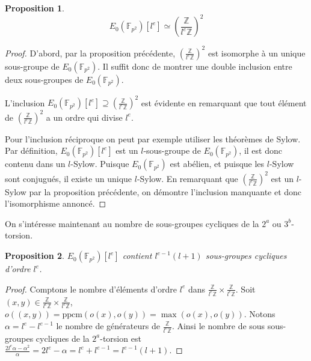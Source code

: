 \documentclass{article}
\newtheorem{prop}{Proposition}
\newcommand{\Fq}{\mathbb{F}_{p^2}}
\newcommand{\Z}{\mathbb{Z}}
\begin{document}
\begin{prop}
  $$E_0(\Fq)[l^e] \simeq \left(  \frac{\Z}{l^e\Z} \right)^2 $$
\end{prop}

\begin{proof}
  D'abord, par la proposition précédente, $\left(  \frac{\Z}{l^e\Z} \right)^2$ est isomorphe à un unique sous-groupe de $E_0(\Fq)$.
  Il suffit donc de montrer une double inclusion entre deux sous-groupes de $E_0(\Fq)$.
  
  L'inclusion $E_0(\Fq)[l^e] \supseteq \left(  \frac{\Z}{l^e\Z} \right)^2$ est évidente en remarquant que tout élément de $\left(  \frac{\Z}{l^e\Z} \right)^2$ a un ordre qui divise $l^e$.
  
  Pour l'inclusion réciproque on peut par exemple utiliser les théorèmes de Sylow. Par définition, $E_0(\Fq)[l^e]$ est un $l$-sous-groupe de $E_0(\Fq)$, il est donc contenu dans un $l$-Sylow. Puisque $E_0(\Fq)$ est abélien, et puisque les $l$-Sylow sont conjugués, il existe un unique $l$-Sylow. En remarquant que $\left(  \frac{\Z}{l^e\Z} \right)^2$ est un $l$-Sylow par la proposition précédente, on démontre l'inclusion manquante et donc l'isomorphisme annoncé. 
\end{proof}

On s'intéresse maintenant au nombre de sous-groupes cycliques de la $2^a$ ou $3^b$-torsion.

\begin{prop}
  $E_0(\Fq)[l^e]$ contient $l^{e-1}(l+1)$ sous-groupes cycliques d'ordre $l^e$.
\end{prop}
\begin{proof}
  Comptons le nombre d'éléments d'ordre $l^e$ dans $\frac{\Z}{l^e\Z} \times \frac{\Z}{l^e\Z}$.
  Soit $\left( x, y \right) \in \frac{\Z}{l^e\Z} \times \frac{\Z}{l^e\Z}$, $o((x, y)) =\textrm{ppcm}(o(x), o(y)) = \max(o(x),o(y))$.
  Notons $\alpha = l^{e} - l^{e-1}$ le nombre de générateurs de $\frac{\Z}{l^e\Z}$. 
  Ainsi le nombre de sous sous-groupes cycliques de la $2^a$-torsion est $\frac{2l^e\alpha -\alpha^2}{\alpha} = 2l^e-\alpha = l^e + l^{e-1} = l^{e-1}(l + 1)$.
\end{proof}
\end{document}
